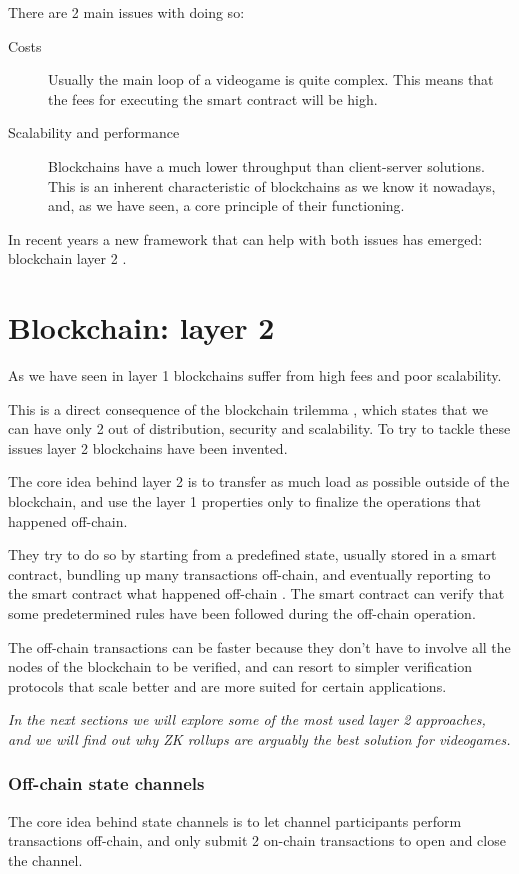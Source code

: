 \documentclass[12pt]{article}
\begin{document}
There are 2 main issues with doing so:
\begin{description}
    \item[Costs] Usually the main loop of a videogame is quite complex. This means that the fees for executing the smart contract will be high.
    \item[Scalability and performance] Blockchains have a much lower throughput than client-server solutions. This is an inherent characteristic of blockchains as we know it nowadays, and, as we have seen, a core principle of their functioning.
\end{description}

In recent years a new framework that can help with both issues has emerged: blockchain layer 2 \cite{ethereum_scaling}.

\newpage
\part{Blockchain: layer 2} \label{part:bl2}
As we have seen in  layer 1 blockchains suffer from high fees and poor scalability.

This is a direct consequence of the blockchain trilemma \cite{blockchain_trilemma}, which states that we can have only 2 out of distribution, security and scalability.
To try to tackle these issues layer 2 blockchains have been invented.

The core idea behind layer 2 is to transfer as much load as possible outside of the blockchain, and use the layer 1 properties only to finalize the operations that happened off-chain.

They try to do so by starting from a predefined state, usually stored in a smart contract, bundling up many transactions off-chain, and eventually reporting to the smart contract what happened off-chain \cite{ethereum_layer2}.
The smart contract can verify that some predetermined rules have been followed during the off-chain operation. 

The off-chain transactions can be faster because they don't have to involve all the nodes of the blockchain to be verified, and can resort to simpler verification protocols that scale better and are more suited for certain applications.

\emph{In the next sections we will explore some of the most used layer 2 approaches, and we will find out why ZK rollups are arguably the best solution for videogames.}

\section{Off-chain state channels} \label{section:ocsc}
The core idea behind state channels is to let channel participants perform transactions off-chain, and only submit 2 on-chain transactions to open and close the channel.
\end{document}
